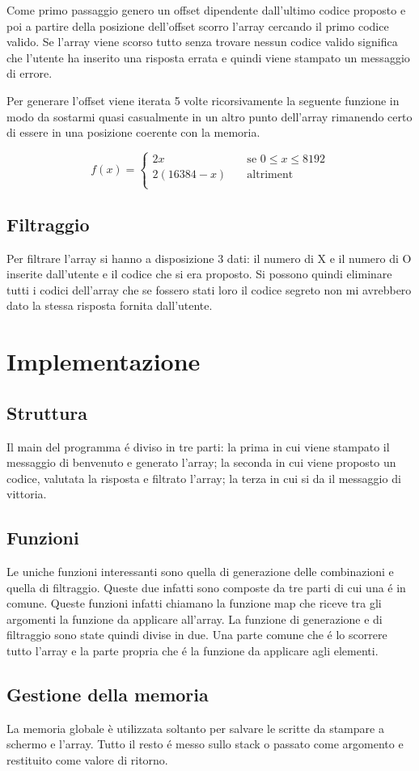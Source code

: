 \documentclass{article}
\begin{document}
Come primo passaggio genero un offset dipendente dall'ultimo codice proposto e poi a partire della posizione dell'offset scorro l'array cercando il primo codice valido. Se l'array viene scorso tutto senza trovare nessun codice valido significa che l'utente ha inserito una risposta errata e quindi viene stampato un messaggio di errore.

Per generare l'offset viene iterata 5 volte ricorsivamente la seguente funzione in modo da sostarmi quasi casualmente in un altro punto dell'array rimanendo certo di essere in una posizione coerente con la memoria.

\[ f(x) =
  \begin{cases}
    2x       & \quad \text{se } 0 \le x \le 8192\\
    2(16384 - x )  & \quad \text{altriment}\\
  \end{cases}
\] 

\subsection{Filtraggio}
Per filtrare l'array si hanno a disposizione 3 dati: il numero di X e il numero di O inserite dall'utente e il codice che si era proposto. Si possono quindi eliminare tutti i codici dell'array che se fossero stati loro il codice segreto non mi avrebbero dato la stessa risposta fornita dall'utente.

\section{Implementazione}
\subsection{Struttura}
Il main del programma \'e diviso in tre parti: la prima in cui viene stampato il messaggio di benvenuto e generato l'array; la seconda in cui viene proposto un codice, valutata la risposta e filtrato l'array; la terza in cui si da il messaggio di vittoria. 

\subsection{Funzioni}
Le uniche funzioni interessanti sono quella di generazione delle combinazioni e quella di filtraggio. Queste due infatti sono composte da tre parti di cui una \'e in comune. Queste funzioni infatti chiamano la funzione map che riceve tra gli argomenti la funzione da applicare all'array. La funzione di generazione e di filtraggio sono state quindi divise in due. Una parte comune che \'e lo scorrere tutto l'array e la parte propria che \'e la funzione da applicare agli elementi. 

\subsection{Gestione della memoria}
La memoria globale è utilizzata soltanto per salvare le scritte da stampare a schermo e l'array. Tutto il resto \'e messo sullo stack o passato come argomento e restituito come valore di ritorno.
\end{document}
